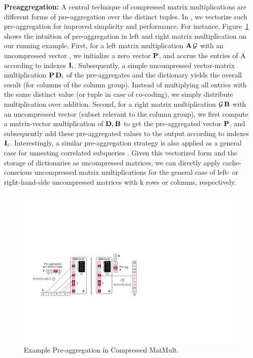 \textbf{Preaggregation:} A central technique of compressed matrix multiplications are different forms of pre-aggregation over the distinct tuples.
In \name, we vectorize such pre-aggregation for improved simplicity and performance.
For instance, Figure~\ref{fig:preagg} shows the intuition of pre-aggregation in left and right matrix multiplication on our running example.
First, for a left matrix multiplication $\mathbf{A}\,\mathcal{G}$ with an uncompressed vector ,
we initialize a zero vector $\mathbf{P}$, and accrue the entries of A according to indexes $\mathbf{I}_i$.
Subsequently, a simple uncompressed vector-matrix multiplication $\mathbf{P}\,\mathbf{D}_i$ of the pre-aggregates and the dictionary yields the overall result (for columns of the column group).
Instead of multiplying all entries with the same distinct value (or tuple in case of co-coding),
we simply distribute multiplication over addition.
Second, for a right matrix multiplication $\mathcal{G}\,\mathbf{B}$ with an uncompressed vector  (subset relevant to the column group),
we first compute a matrix-vector multiplication of $\mathbf{D}_i\,\mathbf{B}$ to get the pre-aggregated vector $\mathbf{P}$, and subsequently add these pre-aggregated values to the output according to indexes $\mathbf{I}_i$. Interestingly, a similar pre-aggregation strategy is also applied as a general case for unnesting correlated subqueries \cite{0001K15}. Given this vectorized form and the storage of dictionaries as uncompressed matrices, we can directly apply cache-conscious uncompressed matrix multiplications for the general case of left- or right-hand-side uncompressed matrices with k rows or columns, respectively.

\begin{figure}[!t]
	\centering
	\includegraphics[width = 0.8\linewidth]{fig/fig04}
	\vspace{-0.25cm}
	\caption{\label{fig:preagg}Example Pre-aggregation in Compressed MatMult.}
	\Description{}
\end{figure}


